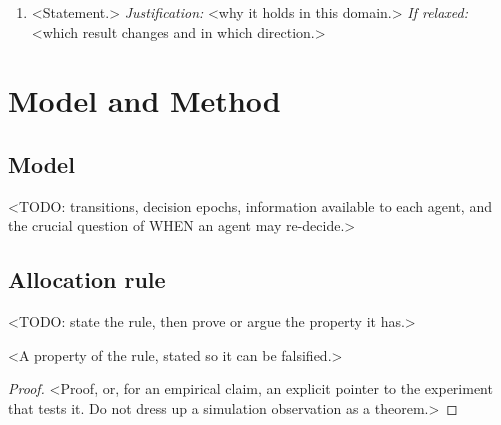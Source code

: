\documentclass[10pt]{article}
\begin{document}
\begin{csfasm}[Assumptions]
\begin{enumerate}
  \item <Statement.> \emph{Justification:} <why it holds in this domain.>
    \emph{If relaxed:} <which result changes and in which direction.>
\end{enumerate}
\end{csfasm}

\section{Model and Method}
\label{sec:model}

\subsection{Model}
<TODO: transitions, decision epochs, information available to each agent, and the
crucial question of WHEN an agent may re-decide.>

\subsection{Allocation rule}
<TODO: state the rule, then prove or argue the property it has.>

\begin{csfproposition}
  <A property of the rule, stated so it can be falsified.>
\end{csfproposition}
\begin{proof}
  <Proof, or, for an empirical claim, an explicit pointer to the experiment that
  tests it. Do not dress up a simulation observation as a theorem.>
\end{proof}
\end{document}

